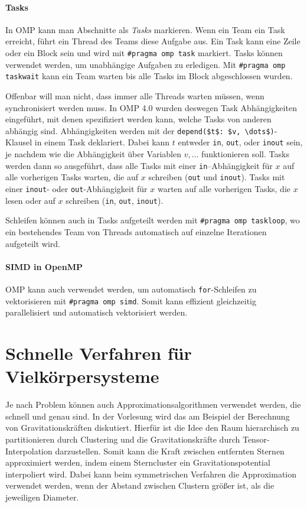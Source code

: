 \paragraph{Tasks}
In OMP kann man Abschnitte als \emph{Tasks} markieren.
Wenn ein Team ein Task erreicht, führt ein Thread des Teams diese Aufgabe aus.
Ein Task kann eine Zeile oder ein Block sein und wird mit \lstinline|#pragma omp task| markiert.
Tasks können verwendet werden, um unabhängige Aufgaben zu erledigen.
Mit \lstinline|#pragma omp taskwait| kann ein Team warten bis alle Tasks im Block abgeschlossen wurden.

Offenbar will man nicht, dass immer alle Threads warten müssen, wenn synchronisiert werden muss.
In OMP 4.0 wurden deswegen Task Abhängigkeiten eingeführt, mit denen spezifiziert werden kann, welche Tasks von anderen abhängig sind.
Abhängigkeiten werden mit der \lstinline|depend($t$: $v, \dots$)|-Klausel in einem Task deklariert.
Dabei kann \(t\) entweder \lstinline|in|, \lstinline|out|, oder \lstinline|inout| sein, je nachdem wie die Abhängigkeit über Variablen \(v, \dots\) funktionieren soll.
Tasks werden dann so ausgeführt, dass alle Tasks mit einer \lstinline|in|--Abhängigkeit für \(x\) auf alle vorherigen Tasks warten, die auf \(x\) schreiben (\lstinline|out| und \lstinline|inout|).
Tasks mit einer \lstinline|inout|- oder \lstinline|out|-Abhängigkeit für \(x\) warten auf alle vorherigen Tasks, die \(x\) lesen oder auf \(x\) schreiben (\lstinline|in|, \lstinline|out|, \lstinline|inout|).

Schleifen können auch in Tasks aufgeteilt werden mit \lstinline|#pragma omp taskloop|, wo ein bestehendes Team von Threads automatisch auf einzelne Iterationen aufgeteilt wird.

\paragraph{SIMD in OpenMP}
OMP kann auch verwendet werden, um automatisch \lstinline|for|-Schleifen zu vektorisieren mit \lstinline|#pragma omp simd|.
Somit kann effizient gleichzeitig parallelisiert und automatisch vektorisiert werden.

\section{Schnelle Verfahren für Vielkörpersysteme}
Je nach Problem können auch Approximationsalgorithmen verwendet werden, die schnell und genau sind.
In der Vorlesung wird das am Beispiel der Berechnung von Gravitationskräften diskutiert.
Hierfür ist die Idee den Raum hierarchisch zu partitionieren durch Clustering und die Gravitationskräfte durch Tensor-Interpolation darzustellen.
Somit kann die Kraft zwischen entfernten Sternen approximiert werden, indem einem Sterncluster ein Gravitationspotential interpoliert wird.
Dabei kann beim symmetrischen Verfahren die Approximation verwendet werden, wenn der Abstand zwischen Clustern größer ist, als die jeweiligen Diameter.

